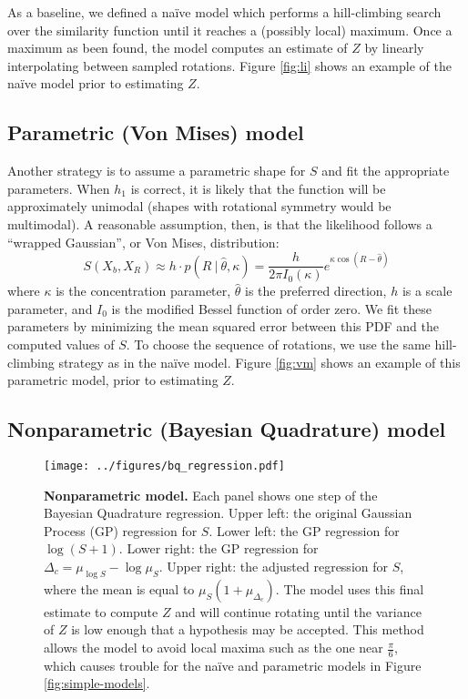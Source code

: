 \documentclass{article} %
\newcommand{\naive}[0]{na\"ive}
\begin{document}
As a baseline, we defined a \naive{} model which performs a
hill-climbing search over the similarity function until it reaches a
(possibly local) maximum. Once a maximum as been found, the model
computes an estimate of $Z$ by linearly interpolating between sampled
rotations. Figure \ref{fig:li} shows an example of the \naive{} model
prior to estimating $Z$.

\subsection{Parametric (Von Mises) model}

Another strategy is to assume a parametric shape for $S$ and fit the
appropriate parameters. When $h_1$ is correct, it is likely that the
function will be approximately unimodal (shapes with rotational
symmetry would be multimodal). A reasonable assumption, then, is that
the likelihood follows a ``wrapped Gaussian'', or Von Mises,
distribution:
\begin{equation}
  S(X_b, X_R) \approx h\cdot{}p(R\ \vert\ \hat{\theta}, \kappa)=\frac{h}{2\pi I_0(\kappa)}e^{\kappa\cos(R-\hat{\theta})}
\end{equation}
where $\kappa$ is the concentration parameter, $\hat{\theta}$ is the
preferred direction, $h$ is a scale parameter, and $I_0$ is the
modified Bessel function of order zero. We fit these parameters by
minimizing the mean squared error between this PDF and the computed
values of $S$. To choose the sequence of rotations, we use the same
hill-climbing strategy as in the \naive{} model. Figure \ref{fig:vm}
shows an example of this parametric model, prior to estimating $Z$.

\subsection{Nonparametric (Bayesian Quadrature) model}

\begin{figure}[t]
  \centering
  \texttt{[image: ../figures/bq\_regression.pdf]}
  \caption{\textbf{Nonparametric model.} Each panel shows one step of
    the Bayesian Quadrature regression. Upper left: the original
    Gaussian Process (GP) regression for $S$. Lower left: the GP
    regression for $\log(S+1)$. Lower right: the GP regression for
    $\Delta_c=\mu_{\log S} - \log \mu_S$. Upper right: the adjusted
    regression for $S$, where the mean is equal to
    $\mu_S(1+\mu_{\Delta_c})$. The model uses this final estimate to
    compute $Z$ and will continue rotating until the variance of $Z$
    is low enough that a hypothesis may be accepted. This method
    allows the model to avoid local maxima such as the one near
    $\frac{\pi}{6}$, which causes trouble for the \naive{} and
    parametric models in Figure \ref{fig:simple-models}.}
  \label{fig:bq}
\end{figure}
\end{document}
